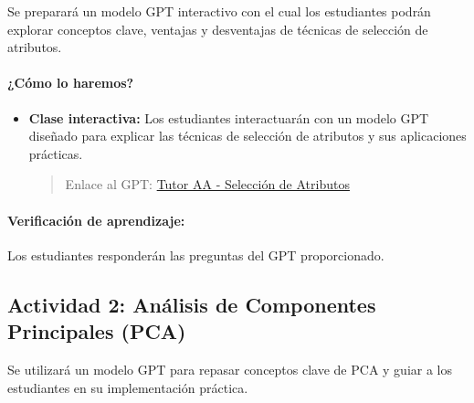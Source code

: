 \documentclass[a4,11pt]{aleph-notas}
\begin{document}
Se preparará un modelo GPT interactivo con el cual los estudiantes podrán explorar conceptos clave, ventajas y desventajas de técnicas de selección de atributos.

\paragraph{¿Cómo lo haremos?}  
\begin{itemize}[leftmargin=*]
    \item \textbf{Clase interactiva:}  
    Los estudiantes interactuarán con un modelo GPT diseñado para explicar las técnicas de selección de atributos y sus aplicaciones prácticas.
    \begin{quote}
        Enlace al GPT: \href{https://chatgpt.com/g/g-674f787b286c8191aee6a93bde4ede57-tutor-aa-seleccion-de-atributos}{Tutor AA - Selección de Atributos}
    \end{quote}
\end{itemize}

\paragraph{Verificación de aprendizaje:}  
Los estudiantes responderán las preguntas del GPT proporcionado.

\subsection*{Actividad 2: Análisis de Componentes Principales (PCA)}

Se utilizará un modelo GPT para repasar conceptos clave de PCA y guiar a los estudiantes en su implementación práctica.
\end{document}
